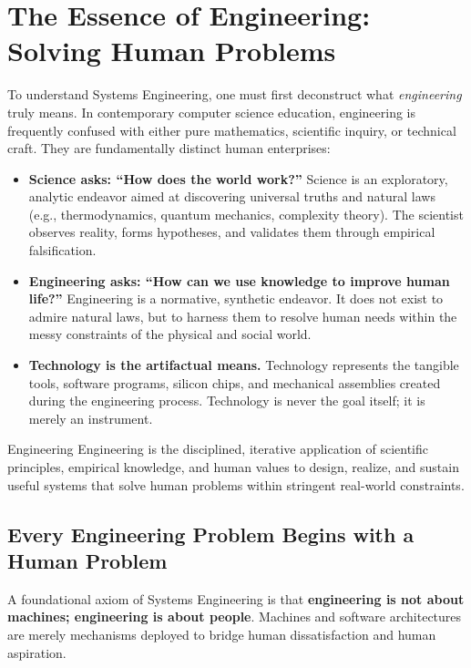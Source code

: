 \section{The Essence of Engineering: Solving Human Problems}
\label{sec:essence_engineering}

To understand Systems Engineering, one must first deconstruct what \textit{engineering} truly means. In contemporary computer science education, engineering is frequently confused with either pure mathematics, scientific inquiry, or technical craft. They are fundamentally distinct human enterprises:

\begin{itemize}[leftmargin=2em]
    \item \textbf{Science asks: ``How does the world work?''} Science is an exploratory, analytic endeavor aimed at discovering universal truths and natural laws (e.g., thermodynamics, quantum mechanics, complexity theory). The scientist observes reality, forms hypotheses, and validates them through empirical falsification.
    \item \textbf{Engineering asks: ``How can we use knowledge to improve human life?''} Engineering is a normative, synthetic endeavor. It does not exist to admire natural laws, but to harness them to resolve human needs within the messy constraints of the physical and social world.
    \item \textbf{Technology is the artifactual means.} Technology represents the tangible tools, software programs, silicon chips, and mechanical assemblies created during the engineering process. Technology is never the goal itself; it is merely an instrument.
\end{itemize}

\begin{definitionbox}{Engineering}
Engineering is the disciplined, iterative application of scientific principles, empirical knowledge, and human values to design, realize, and sustain useful systems that solve human problems within stringent real-world constraints.
\end{definitionbox}

\subsection{Every Engineering Problem Begins with a Human Problem}
A foundational axiom of Systems Engineering is that \textbf{engineering is not about machines; engineering is about people}. Machines and software architectures are merely mechanisms deployed to bridge human dissatisfaction and human aspiration.

